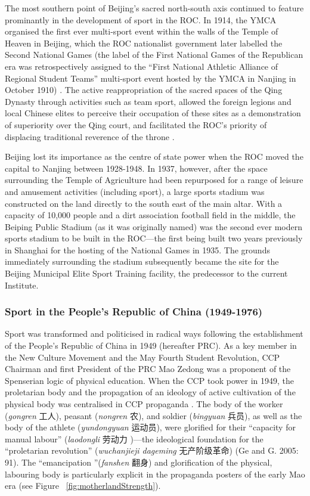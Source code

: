 {The most southern point of Beijing's sacred north-south axis continued to feature prominantly in the development of sport in the ROC.  In 1914, the YMCA organised the first ever multi-sport event within the walls of the Temple of Heaven in Beijing, which the ROC nationalist government later labelled the Second National Games (the label of the First National Games of the Republican era was retrospectively assigned to the ``First National Athletic Alliance of Regional Student Teams'' multi-sport event hosted by the YMCA in Nanjing in October 1910) \citep[441]{Li2015}. The active reappropriation of the sacred spaces of the Qing Dynasty through activities such as team sport, allowed the foreign legions and local Chinese elites to perceive their occupation of these sites as a demonstration of superiority over the Qing court, and facilitated the ROC's priority of displacing traditional reverence of the throne \citep{Hevia1990}.

Beijing lost its importance as the centre of state power when the ROC moved the capital to Nanjing between 1928-1948.  In 1937, however, after the space surrounding the Temple of Agriculture had been repurposed for a range of leisure and amusement activities (including sport), a large sports stadium was constructed on the land directly to the south east of the main altar.  With a capacity of 10,000 people and a dirt association football field in the middle, the Beiping Public Stadium (as it was originally named) was the second ever modern sports stadium to be built in the ROC---the first being built two years previously in Shanghai for the hosting of the National Games in 1935.  The grounds immediately surrounding the stadium subsequently became the site for the Beijing Municipal Elite Sport Training facility, the predecessor to the current Institute.


\subsubsection{Sport in the People's Republic of China (1949-1976)}
Sport was transformed and politicised in radical ways following the establishment of the People’s Republic of China in 1949 (hereafter PRC).  As a key member in the New Culture Movement and the May Fourth Student Revolution, CCP Chairman and first President of the PRC Mao Zedong was a proponent of the Spenserian logic of physical education.  When the CCP took power in 1949, the proletarian body and the propagation of an ideology of active cultivation of the physical body was centralised in CCP propaganda \citep[58]{Brownell1995}.  The body of the worker (\textit{gongren} 工人), peasant (\textit{nongren} 农), and soldier (\textit{bingyuan} 兵员), as well as the body of the athlete (\textit{yundongyuan} 运动员), were glorified for their ``capacity for manual labour'' (\textit{laodongli} 劳动力 )---the ideological foundation for the ``proletarian revolution'' (\textit{wuchanjieji dageming} 无产阶级革命) (Ge and G. 2005: 91).  The ``emancipation ''(\textit{fanshen} 翻身) and glorification of the physical, labouring body is particularly explicit in the propaganda posters of the early Mao era \citep[87]{Ge2005} (see Figure ~\ref{fig:motherlandStrength}).

}
